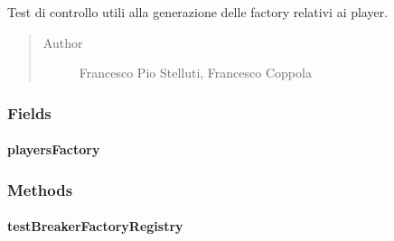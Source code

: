 \documentclass[letterpaper,10pt,italian,openany,oneside]{sphinxmanual}
\begin{document}
\begin{fulllineitems}
\label{\detokenize{test/it/unicam/cs/pa/mastermind/test/PlayersFactoryRegistry:it.unicam.cs.pa.mastermind.test.PlayersFactoryRegistry}}
Test di controllo utili alla generazione delle factory relativi ai player.
\begin{quote}\begin{description}
\item[{Author}] \leavevmode
Francesco Pio Stelluti, Francesco Coppola

\end{description}\end{quote}

\end{fulllineitems}



\subsubsection{Fields}
\label{\detokenize{test/it/unicam/cs/pa/mastermind/test/PlayersFactoryRegistry:fields}}

\paragraph{playersFactory}
\label{\detokenize{test/it/unicam/cs/pa/mastermind/test/PlayersFactoryRegistry:playersfactory}}

\begin{fulllineitems}
\label{\detokenize{test/it/unicam/cs/pa/mastermind/test/PlayersFactoryRegistry:it.unicam.cs.pa.mastermind.test.PlayersFactoryRegistry.playersFactory}}
\end{fulllineitems}



\subsubsection{Methods}
\label{\detokenize{test/it/unicam/cs/pa/mastermind/test/PlayersFactoryRegistry:methods}}

\paragraph{testBreakerFactoryRegistry}
\label{\detokenize{test/it/unicam/cs/pa/mastermind/test/PlayersFactoryRegistry:testbreakerfactoryregistry}}
\end{document}
